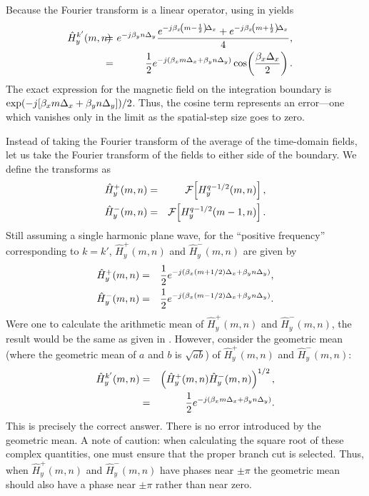 Because the Fourier transform is a linear operator, using
 in  yields
\begin{eqnarray}
 \hspace{-.15in} 
  \hat{H}^{k'}_y(m,n) \!\!\!\!\!&=&\!\!\!\!
   e^{-j\beta_y n\Dely}
   \frac{e^{-j\beta_x\!\left(m-\frac{1}{2}\right)\!\Delx} + 
         e^{-j\beta_x\!\left(m+\frac{1}{2}\right)\!\Delx}}{4}, \\
   &=&\!\!\!\!
   \half e^{-j(\beta_x m \Delx + \beta_y n\Dely)} 
   \cos\!\left(\frac{\beta_x\Delx}{2}\right).
   \label{eq:arithmeticPlane}
\end{eqnarray}
The exact expression for the magnetic field on the integration
boundary is $\exp(-j[\beta_x m \Delta_x + \beta_y n\Delta_y])/2$.  Thus, the
cosine term represents an error---one which vanishes only in the limit
as the spatial-step size goes to zero.

Instead of taking the Fourier transform of the average of the
time-domain fields, let us take the Fourier transform of the fields to
either side of the boundary.  We define the transforms as
\begin{eqnarray}
  \hat{H}^+_y(m,n) &=& 
    {\cal F}\!\left[H_y^{q-1/2}(m,n)\right], \\
  \hat{H}^-_y(m,n) &=& 
    {\cal F}\!\left[H_y^{q-1/2}(m-1,n)\right].
\end{eqnarray}
Still assuming a single harmonic plane wave, for the ``positive
frequency'' corresponding to $k=k'$, $\hat{H}^+_y(m,n)$ and
$\hat{H}^-_y(m,n)$ are given by
\begin{eqnarray}
  \hat{H}^+_y(m,n) &=& 
    \frac{1}{2} e^{-j(\beta_x(m+1/2)\Delta_x + \beta_y n\Delta_y)}, \\
  \hat{H}^-_y(m,n) &=& 
    \frac{1}{2} e^{-j(\beta_x(m-1/2)\Delta_x + \beta_y n\Delta_y)}.
\end{eqnarray}
Were one to calculate the arithmetic mean of $\hat{H}^+_y(m,n)$ and
$\hat{H}^-_y(m,n)$, the result would be the same as given in
.  However, consider the geometric mean
(where the geometric mean of $a$ and $b$ is $\sqrt{ab}$) of 
$\hat{H}^+_y(m,n)$ and
$\hat{H}^-_y(m,n)$:
\begin{eqnarray}
  \hat{H}^{k'}_y(m,n) &=&
    \left(\hat{H}^+_y(m,n)\hat{H}^-_y(m,n)\right)^{1/2}, \\
  &=&  
    \frac{1}{2} e^{-j(\beta_x m\Delta_x + \beta_y n\Delta_y)}.
\end{eqnarray}
This is precisely the correct answer.  There is no error introduced by
the geometric mean.  A note of caution: when calculating the square
root of these complex quantities, one must ensure that the proper
branch cut is selected.  Thus, when $\hat{H}^+_y(m,n)$ and
$\hat{H}^-_y(m,n)$ have phases near $\pm\pi$ the geometric mean should
also have a phase near $\pm\pi$ rather than near zero.

